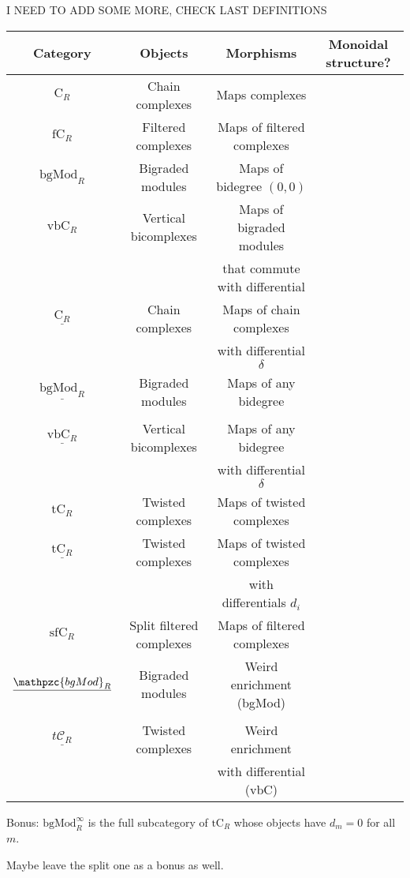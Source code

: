 \documentclass[twoside]{article}
\begin{document}
I NEED TO ADD SOME MORE, CHECK LAST DEFINITIONS
\begin{tabular}{|c|c|c|c}
\hline
\textbf{Category} & \textbf{Objects} & \textbf{Morphisms} & Monoidal structure?\\
\hline
$\mathrm{C}_R$ & Chain complexes & Maps complexes &\\
\hline
$\mathrm{fC}_R$ & Filtered complexes & Maps of filtered complexes &\\
\hline
$\mathrm{bgMod}_R$ & Bigraded modules & Maps of bidegree $(0,0)$&\\
\hline
$\mathrm{vbC}_R$ & Vertical bicomplexes & Maps of bigraded modules & \\
                 &                      & that commute with differential & \\ 
\hline
$\underline{\mathrm{C}_R}$ & Chain complexes & Maps of chain complexes &\\
                           &                 & with differential $\delta$&\\
\hline
$\underline{\mathrm{bgMod}_R}$ & Bigraded modules & Maps of any bidegree & \\
& & &\\
\hline
$\underline{\mathrm{vbC}_R}$ & Vertical bicomplexes & Maps of any bidegree &\\
                             &                      & with differential $\delta$&\\
\hline
$\mathrm{tC}_R$& Twisted complexes & Maps of twisted complexes & \\
\hline
$\underline{\mathrm{tC}_R}$ & Twisted complexes & Maps of twisted complexes & \\
& & with differentials $d_i$&\\
\hline
$\mathrm{sfC}_R$ & Split filtered complexes & Maps of filtered complexes & \\
\hline
$\underline{\mathpzc{bgMod}_R}$ & Bigraded modules & Weird enrichment (bgMod)&\\
& & &\\
\hline
$\underline{t\mathcal{C}_R}$& Twisted complexes & Weird enrichment &\\
& & with differential (vbC) & \\
\end{tabular}

Bonus: $\mathrm{bgMod}^\infty_R$ is the full subcategory of $\mathrm{tC}_R$ whose objects have $d_m=0$ for all $m$.

Maybe leave the split one as a bonus as well. 
\end{document}
